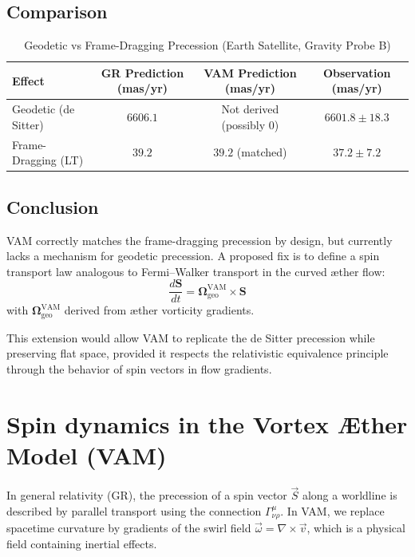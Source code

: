 \documentclass[a4paper, aps,preprint,superscriptaddress, 12pt]{revtex4}
\begin{document}
\subsection*{Comparison}

\begin{table}[h!]
    \centering
    \caption{Geodetic vs Frame-Dragging Precession (Earth Satellite, Gravity Probe B)}
    \label{tab:geodetic}
    \begin{tabular}{lccc}
        \toprule
        Effect & GR Prediction (mas/yr) & VAM Prediction (mas/yr) & Observation (mas/yr) \\
        \midrule
        Geodetic (de Sitter) & $6606.1$ & Not derived (possibly $0$) & $6601.8 \pm 18.3$ \\
        Frame-Dragging (LT)  & $39.2$   & $39.2$ (matched)           & $37.2 \pm 7.2$ \\
        \bottomrule
    \end{tabular}
\end{table}

\subsection*{Conclusion}

VAM correctly matches the frame-dragging precession by design, but currently lacks a mechanism for geodetic precession. A proposed fix is to define a spin transport law analogous to Fermi--Walker transport in the curved æther flow:
\begin{equation}
    \frac{d\mathbf{S}}{dt} = \boldsymbol{\Omega}_\text{geo}^\text{VAM} \times \mathbf{S}
\end{equation}
with $\boldsymbol{\Omega}_\text{geo}^\text{VAM}$ derived from æther vorticity gradients.

This extension would allow VAM to replicate the de Sitter precession while preserving flat space, provided it respects the relativistic equivalence principle through the behavior of spin vectors in flow gradients.
\section{Spin dynamics in the Vortex Æther Model (VAM)}

In general relativity (GR), the precession of a spin vector \( \vec{S} \) along a worldline is described by parallel transport using the connection \( \Gamma^\mu_{\nu\rho} \). In VAM, we replace spacetime curvature by gradients of the swirl field \( \vec{\omega} = \nabla \times \vec{v} \), which is a physical field containing inertial effects.
\end{document}
